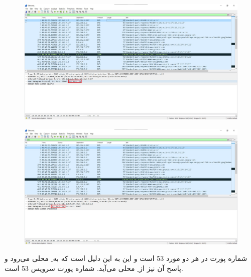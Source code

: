 \documentclass{article}
\begin{document}
\subsection{}
\begin{figure}[H]
    \centering
    \includegraphics[width=1.0\textwidth]{figures/52.jpg}
    \caption{}
    \label{fig:fig1}
\end{figure}
\begin{figure}[H]
    \centering
    \includegraphics[width=1.0\textwidth]{figures/53.jpg}
    \caption{}
    \label{fig:fig1}
\end{figure}
شماره پورت در هر دو مورد 53 است و این به این دلیل است که  به ِ محلی می‌رود و پاسخ آن نیز از ِ محلی می‌آید. شماره پورت سرویس  53 است.
\end{document}
